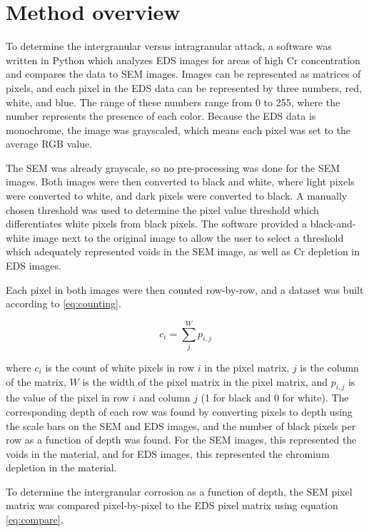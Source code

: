 \documentclass[10pt]{exam}
\begin{document}
\section{Method overview}

To determine the intergranular versus intragranular attack, a software was 
written in Python
which analyzes EDS images for areas of high Cr concentration and compares 
the data to SEM images. Images can be represented as matrices of pixels, 
and each pixel in the EDS data can be represented by three
numbers, red, white, and blue. The range of these numbers range from 0 to 255,
where the number represents the presence of each color. Because the EDS data
is monochrome, the image was grayscaled, which means each pixel was set
to the average RGB value. \par

The SEM was already grayscale, so no pre-processing was done for the
SEM images. Both images were then converted to black and white, where light
pixels were converted to white, and dark pixels were converted to black. A 
manually chosen threshold was used to determine the pixel value threshold
which differentiates white pixels from black pixels. The software provided
a black-and-white image next to the original image to allow the user to 
select a threshold which adequately represented voids in the SEM image, 
as well as Cr depletion in EDS images. \par

Each pixel in both images were then counted row-by-row, and a dataset was built
according to \cref{eq:counting}.

\begin{equation}
    c_{i} = \sum_{j}^W p_{i,j} 
    \label{eq:counting}
\end{equation}

where $c_{i}$ is the count of white pixels in row $i$ in the pixel matrix, 
$j$ is the column of the matrix, $W$ is the width of the pixel matrix in the 
pixel matrix, and $p_{i,j}$ is the value of the pixel in row $i$ and column $j$
(1 for black and 0 for white).
The corresponding depth of each row was found by converting pixels to 
depth using the scale bars on the SEM and EDS images, and the number of black
pixels per row as a function of depth was found. For the SEM images, this 
represented the voids in the material, and for EDS images, this represented
the chromium depletion in the material. \par

To determine the intergranular corrosion as a function of depth, the 
SEM pixel matrix was compared pixel-by-pixel to the EDS pixel matrix using
equation \ref{eq:compare}. \par
\end{document}
